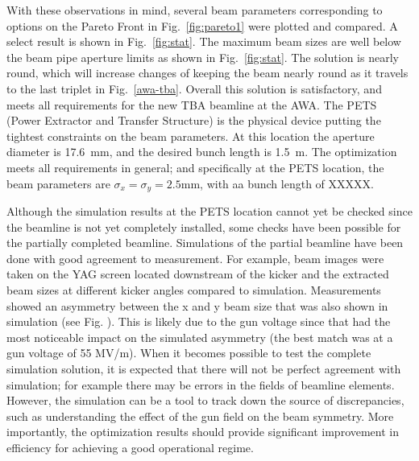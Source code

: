 With these observations in mind, several beam parameters corresponding to
options on the Pareto Front in Fig.~\ref{fig:pareto1} were plotted and compared. 
A select result is shown in Fig.~\ref{fig:stat}.  
The maximum beam sizes are well below the beam pipe aperture limits as shown in Fig.~\ref{fig:stat}.
The solution is nearly round, which will increase changes of keeping the beam nearly round
as it travels to the last triplet in Fig.~\ref{awa-tba}.
Overall this solution is satisfactory, and meets all requirements for the new TBA beamline at the AWA.
The PETS (Power Extractor and Transfer Structure) is the physical device putting the tightest constraints on the beam parameters.  
At this location the aperture diameter is \SI{17.6}{mm}, and the desired bunch length is \SI{1.5}{m}.  
The optimization meets all requirements in general; and specifically at the PETS location, 
the beam parameters are $\sigma_x=\sigma_y=2.5$mm, with aa bunch length of XXXXX. 

 Although the simulation results at the PETS location cannot yet be checked since the beamline is not yet completely installed, some checks have been possible for the partially completed beamline.  Simulations of the partial beamline have been done with good agreement to measurement.  For example, beam images were taken on the YAG screen located downstream of the kicker and the extracted beam sizes at different kicker angles compared to simulation.  Measurements showed an asymmetry between the x and y beam size that was also shown in simulation (see Fig. ).  This is likely due to the gun voltage since that had the most noticeable impact on the simulated asymmetry (the best match was at a gun voltage of 55 MV/m).  When it becomes possible to test the complete simulation solution, it is expected that there will not be perfect agreement with simulation; for example there may be errors in the fields of beamline elements.  However, the simulation can be a tool to track down the source of discrepancies, such as understanding the effect of the gun field on the beam symmetry.  More importantly, the optimization results should provide significant improvement in efficiency for achieving a good operational regime.

